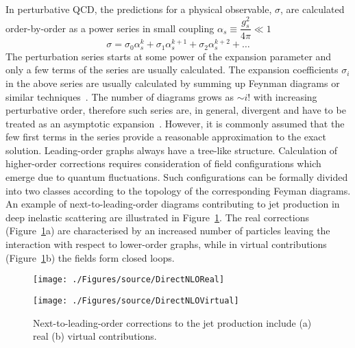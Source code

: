 In perturbative QCD, the predictions for a physical observable, $\sigma$, are calculated order-by-order as a power series in small coupling $\alpha_s \equiv \dfrac{g_s^2}{4\pi} \ll 1$
\begin{equation}
   \sigma=\sigma_{0}\alpha^{k}_s + \sigma_{1}\alpha^{k+1}_s + \sigma_{2}\alpha^{k+2}_s + \ldots
	 \label{eq:pertseries}
\end{equation}
The perturbation series starts at some power of the expansion parameter and only a few terms of the series are usually calculated. The expansion coefficients $\sigma_i$ in the above series are usually calculated by summing up Feynman diagrams or similar techniques~\cite{Henn:2014yza}. The number of diagrams grows as $\sim i!$ with increasing perturbative order, therefore such series are, in general, divergent and have to be treated as an asymptotic expansion~\cite{Ioffe:2010zz}. However, it is commonly assumed that the few first terms in the series provide a reasonable approximation to the exact solution. Leading-order graphs always have a tree-like structure. Calculation of higher-order corrections requires consideration of field configurations which emerge due to quantum fluctuations. Such configurations can be formally divided into two classes according to the topology of the corresponding Feyman diagrams. An example of next-to-leading-order diagrams contributing to jet production in deep inelastic scattering are illustrated in Figure~\ref{fig:nlojetfeyn}. The real corrections (Figure~\ref{fig:nlojetfeyn}a) are characterised by an increased number of particles leaving the interaction with respect to lower-order graphs, while in virtual contributions (Figure~\ref{fig:nlojetfeyn}b) the fields form closed loops.
 
\begin{figure}[h]
	\begin{subfloat}[]{
		\texttt{[image: ./Figures/source/DirectNLOReal]}
		\label{fig:nlojetfeynvirtual}
	 }%
	\end{subfloat}\hfill
	\begin{subfloat}[]{
		\texttt{[image: ./Figures/source/DirectNLOVirtual]}
		\label{fig:nlojetfeynreal}
	}%
	\end{subfloat}
\caption{Next-to-leading-order corrections to the jet production include (a) real (b) virtual contributions.}
\label{fig:nlojetfeyn}
\end{figure}

